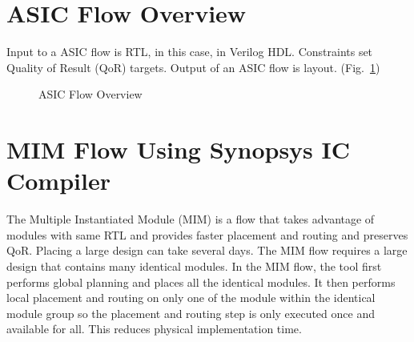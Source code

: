 \section{ASIC Flow Overview}
\label{sec:asic_flow}

Input to a ASIC flow is RTL, in this case, in Verilog HDL. Constraints set Quality of Result (QoR) targets. Output of an ASIC flow is layout. (Fig.~\ref{fig:asic_flow_overview}) \par

\begin{figure}[htp]
	\begin{center}
		\epsfxsize=3.5in
		    \renewcommand{\captionfont}{\small}
				\caption{ASIC Flow Overview
				\label{fig:asic_flow_overview}}
	\end{center}
\end{figure}

\section{MIM Flow Using Synopsys IC Compiler}
\label{sec:mim_flow}

The Multiple Instantiated Module (MIM) is a flow that takes advantage of modules with same RTL and provides faster placement and routing and preserves QoR. Placing a large
design can take several days. The MIM flow requires a large design that contains many identical modules. In the MIM flow, the tool first performs global planning and places
all the identical modules. It then performs local placement and routing on only one of the module within the identical module group so the placement and routing step is only
executed once and available for all. This reduces physical implementation time. \par